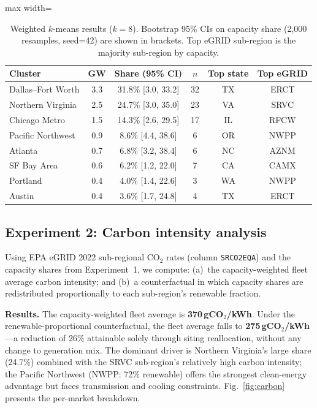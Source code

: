 \documentclass[preprint,12pt]{elsarticle}
\begin{document}
\begin{table}[htbp]
\centering
\caption{Weighted $k$-means results ($k{=}8$). Bootstrap 95\% CIs on
capacity share (2{,}000 resamples, seed=42) are shown in brackets.
Top eGRID sub-region is the majority sub-region by capacity.}
\label{tab:clusters}
\small
\begin{adjustbox}{max width=\linewidth}
\begin{tabular}{@{}p{3.0cm}ccccc@{}}
\toprule
\textbf{Cluster} & \textbf{GW} & \textbf{Share (95\% CI)}
& \textbf{$n$} & \textbf{Top state} & \textbf{Top eGRID} \\
\midrule
Dallas--Fort Worth & 3.3 & 31.8\% [3.0, 33.2]   & 32 & TX & ERCT \\
Northern Virginia & 2.5 & 24.7\% [3.0, 35.0]   & 23 & VA & SRVC \\
Chicago Metro      & 1.5 & 14.3\% [2.6, 29.5]   & 17 & IL & RFCW \\
Pacific Northwest  & 0.9 &  8.6\% [4.4, 38.6]   &  6 & OR & NWPP \\
Atlanta            & 0.7 &  6.8\% [3.2, 38.4]   &  6 & NC & AZNM \\
SF Bay Area        & 0.6 &  6.2\% [1.2, 22.0]   &  7 & CA & CAMX \\
Portland           & 0.4 &  4.0\% [1.4, 22.6]   &  3 & WA & NWPP \\
Austin             & 0.4 &  3.6\% [1.7, 24.8]   &  4 & TX & ERCT \\
\bottomrule
\end{tabular}
\end{adjustbox}
\end{table}

\subsection{Experiment 2: Carbon intensity analysis}
\label{subsec:exp_carbon}

Using EPA eGRID 2022 sub-regional CO$_2$ rates (column \texttt{SRCO2EQA})
and the capacity shares from Experiment~1, we compute:
(a)~the capacity-weighted fleet average carbon intensity; and
(b)~a counterfactual in which capacity shares are redistributed
proportionally to each sub-region's renewable fraction.

\begin{sloppypar}
\textbf{Results.} The capacity-weighted fleet average is
\textbf{370\,gCO$_2$/kWh}. Under the renewable-proportional
counterfactual, the fleet average falls to
\textbf{275\,gCO$_2$/kWh}---a reduction of 26\% attainable solely
through siting reallocation, without any change to generation mix.
The dominant driver is Northern Virginia's large share (24.7\%)
combined with the SRVC sub-region's relatively high carbon intensity;
the Pacific Northwest (NWPP: 72\% renewable) offers the strongest
clean-energy advantage but faces transmission and cooling constraints.
Fig.~\ref{fig:carbon} presents the per-market breakdown.
\end{sloppypar}
\end{document}
